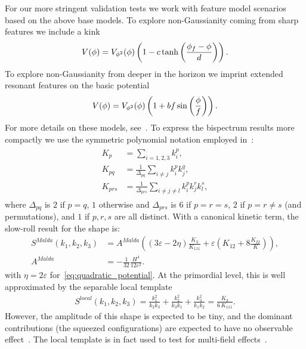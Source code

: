For our more stringent validation tests we work with feature model scenarios
based on the above base models.
To explore non-Gaussianity coming from sharp features we include
a kink
\begin{align}\label{eq:kink_potential}
    V(\phi) = V_{\phi^2}(\phi)\left(1-c\tanh\left(\frac{\phi_f-\phi}{d}\right)\right).
\end{align}
To explore non-Gaussianity from deeper in the horizon we imprint
extended resonant features on the basic potential
\begin{align}\label{eq:resonant_potential}
    V(\phi) = V_{\phi^2}(\phi)\left(1+bf\sin\left(\frac{\phi}{f}\right)\right).
\end{align}
For more details on these models, see~\cite{chen_easther_lim_2}.
To express the bispectrum results more compactly we use the symmetric polynomial notation employed in~\cite{FergShell_2}:
\begin{align}\label{shape_notation}
\begin{split}
    K_p &= \sum_{i=1,2,3} k_i^p, \\
    K_{pq} &= \frac{1}{\Delta_{pq}}\sum_{i\neq j} k_i^p k_j^q,   \\
    K_{prs} &= \frac{1}{\Delta_{prs}}\sum_{i\neq j\neq l} k_i^p k_j^r k_l^s,
\end{split}
\end{align}
where $\Delta_{pq}$ is $2$ if $p=q$, $1$ otherwise
and $\Delta_{prs}$ is $6$ if $p=r=s$, $2$ if $p=r\neq s$ (and permutations),
and $1$ if $p,r,s$ are all distinct.
With a canonical kinetic term, the slow-roll result for the shape is:
\begin{align}\label{malda_shape}
    S^{Malda}(k_1,k_2,k_3) &= A^{Malda} \left( (3\varepsilon-2\eta)\frac{K_3}{K_{111}}+\varepsilon \left(K_{12}+8\frac{K_{22}}{K}\right) \right),\\
    A^{Malda} &= -\frac{1}{32}\frac{H^4}{12\varepsilon^2}.
\end{align}
with $\eta=2\varepsilon$ for~\eqref{eq:quadratic_potential}.
At the primordial level, this is well approximated by the separable local template
\begin{align}\label{local_shape}
S^{local}(k_1,k_2,k_3) = \frac{k_1^2}{k_2k_3}+\frac{k_2^2}{k_3k_1}+\frac{k_3^2}{k_1k_2} = \frac{K_3}{6\,K_{111}}.
\end{align}
However, the amplitude of this shape is expected to be tiny,
and the dominant contributions (the squeezed configurations) are expected
to have no observable effect~\cite{Cabass_2016}.
The local template is in fact used to test for multi-field effects~\cite{Planck_NG_2015}.
